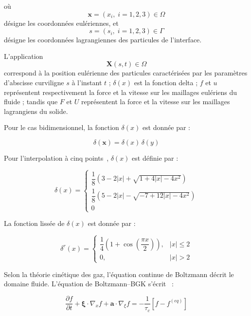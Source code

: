 \documentclass[12pt,a4paper]{report}
\begin{document}
où
\[
\mathbf{x}=(x_i,\; i=1,2,3)\in\Omega
\]
désigne les coordonnées eulériennes, et
\[
s=(s_i,\; i=1,2,3)\in\Gamma
\]
désigne les coordonnées lagrangiennes des particules de l’interface.

L’application
\[
\mathbf{X}(s,t)\in\Omega
\]
correspond à la position eulérienne des particules caractérisées par les paramètres d’abscisse curviligne $s$ à l’instant $t$ ; $\delta(x)$ est la fonction delta ; $f$ et $u$ représentent respectivement la force et la vitesse sur les maillages eulériens du fluide ; tandis que $F$ et $U$ représentent la force et la vitesse sur les maillages lagrangiens du solide.

Pour le cas bidimensionnel, la fonction $\delta(x)$ est donnée par :

\begin{equation}
\delta(\mathbf{x})=\delta(x)\,\delta(y)
\label{eq3}
\end{equation}

Pour l’interpolation à cinq points~\cite{ref33}, $\delta(x)$ est définie par :

\begin{equation}
\delta(x)=
\begin{cases}
\dfrac{1}{8}
\left(
3-2|x|+\sqrt{1+4|x|-4x^{2}}
\right)
\\[0.3cm]
\dfrac{1}{8}
\left(
5-2|x|-\sqrt{-7+12|x|-4x^{2}}
\right)
\\[0.3cm]
0
\end{cases}
\label{eq4}
\end{equation}

La fonction lissée de $\delta(x)$ est donnée par :

\begin{equation}
\delta^{r}(x)=
\begin{cases}
\dfrac{1}{4}
\left(
1+\cos\left(\dfrac{\pi x}{2}\right)
\right),
& |x|\leq 2
\\[0.3cm]
0,
& |x|>2
\end{cases}
\label{eq5}
\end{equation}

Selon la théorie cinétique des gaz, l’équation continue de Boltzmann décrit le domaine fluide. L’équation de Boltzmann--BGK s’écrit~\cite{ref34} :

\begin{equation}
\frac{\partial f}{\partial t}
+
\boldsymbol{\xi}\cdot\nabla_{x}f
+
\mathbf{a}\cdot\nabla_{\xi}f
=
-\frac{1}{\tau_c}
\left[
f-f^{(eq)}
\right]
\label{eq6}
\end{equation}
\end{document}
